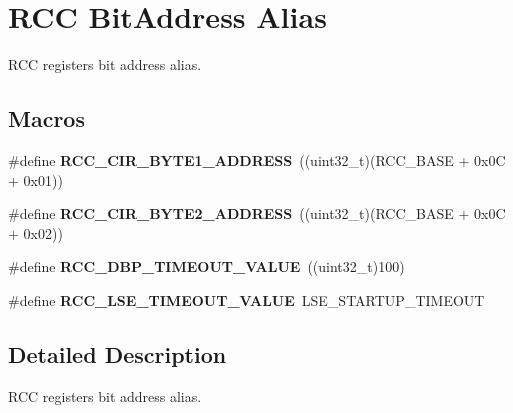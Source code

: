 \hypertarget{group___r_c_c___bit_address___alias}{}\section{R\+CC Bit\+Address Alias}
\label{group___r_c_c___bit_address___alias}


R\+CC registers bit address alias.  


\subsection*{Macros}
\begin{DoxyCompactItemize}
\item 
\mbox{\label{group___r_c_c___bit_address___alias_ga97f80d22ba3506a43accbeb9ceb31f51}} 
\#define {\bfseries R\+C\+C\+\_\+\+C\+I\+R\+\_\+\+B\+Y\+T\+E1\+\_\+\+A\+D\+D\+R\+E\+SS}~((uint32\+\_\+t)(R\+C\+C\+\_\+\+B\+A\+SE + 0x0\+C + 0x01))
\item 
\mbox{\label{group___r_c_c___bit_address___alias_ga1387fb2dfadb830eb83ab2772c8d2294}} 
\#define {\bfseries R\+C\+C\+\_\+\+C\+I\+R\+\_\+\+B\+Y\+T\+E2\+\_\+\+A\+D\+D\+R\+E\+SS}~((uint32\+\_\+t)(R\+C\+C\+\_\+\+B\+A\+SE + 0x0\+C + 0x02))
\item 
\mbox{\label{group___r_c_c___bit_address___alias_gae578b5efd6bd38193ab426ce65cb77b1}} 
\#define {\bfseries R\+C\+C\+\_\+\+D\+B\+P\+\_\+\+T\+I\+M\+E\+O\+U\+T\+\_\+\+V\+A\+L\+UE}~((uint32\+\_\+t)100)
\item 
\mbox{\label{group___r_c_c___bit_address___alias_gafe8ed1c0ca0e1c17ea69e09391498cc7}} 
\#define {\bfseries R\+C\+C\+\_\+\+L\+S\+E\+\_\+\+T\+I\+M\+E\+O\+U\+T\+\_\+\+V\+A\+L\+UE}~L\+S\+E\+\_\+\+S\+T\+A\+R\+T\+U\+P\+\_\+\+T\+I\+M\+E\+O\+UT
\end{DoxyCompactItemize}


\subsection{Detailed Description}
R\+CC registers bit address alias. 

